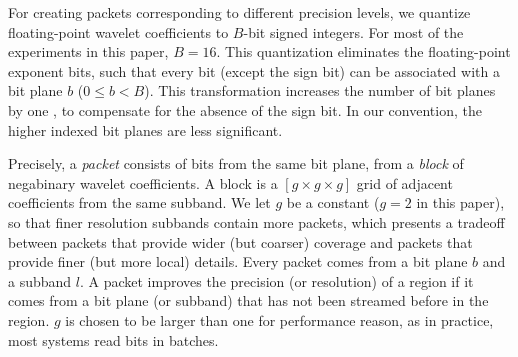 For creating packets corresponding to different
precision levels, we quantize floating-point wavelet coefficients to $B$-bit signed integers. For
most of the experiments in this paper, $B=16$. This quantization eliminates the floating-point exponent bits, such
that every bit (except the sign bit) can be associated with a bit plane $b$ ($0\leq b < B$). 
%
%
This transformation increases the number of bit
planes by one , 
to compensate for the absence of the sign bit. In our convention, the higher indexed
bit planes are less significant.

Precisely, a \emph{packet} consists of bits from the same bit plane, from a \emph{block} of negabinary
wavelet coefficients. A block is a $[g\times g\times g]$ grid of adjacent coefficients from the same
subband. We let $g$ be a constant ($g=2$ in this paper), so that finer resolution subbands contain
more packets, which presents a tradeoff between packets that provide wider (but coarser) coverage
and packets that provide finer (but more local) details. Every packet  
comes from a bit plane $b$
and a subband $l$. A packet improves the precision (or resolution) of a region if it comes from a
bit plane (or subband) that has not been streamed before in the region. $g$ is chosen to be larger
than one for performance reason, as in practice, most systems read bits in batches.

